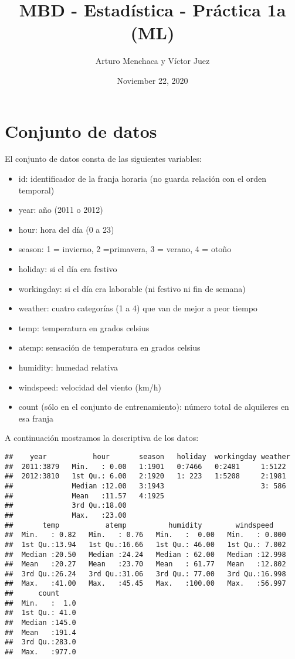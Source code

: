 \documentclass[
]{article}
\title{MBD - Estadística - Práctica 1a (ML)}
\author{Arturo Menchaca y Víctor Juez}
\date{Noviember 22, 2020}
\providecommand{\tightlist}{%
  \setlength{\itemsep}{0pt}\setlength{\parskip}{0pt}}
\begin{document}
\maketitle

\hypertarget{conjunto-de-datos}{%
\section{Conjunto de datos}\label{conjunto-de-datos}}

El conjunto de datos consta de las siguientes variables:

\begin{itemize}
\tightlist
\item
  id: identificador de la franja horaria (no guarda relación con el
  orden temporal)
\item
  year: año (2011 o 2012)
\item
  hour: hora del día (0 a 23)
\item
  season: 1 = invierno, 2 =primavera, 3 = verano, 4 = otoño
\item
  holiday: si el día era festivo
\item
  workingday: si el día era laborable (ni festivo ni fin de semana)
\item
  weather: cuatro categorías (1 a 4) que van de mejor a peor tiempo
\item
  temp: temperatura en grados celsius
\item
  atemp: sensación de temperatura en grados celsius
\item
  humidity: humedad relativa
\item
  windspeed: velocidad del viento (km/h)
\item
  count (sólo en el conjunto de entrenamiento): número total de
  alquileres en esa franja
\end{itemize}

A continuación mostramos la descriptiva de los datos:

\begin{verbatim}
##    year           hour       season   holiday  workingday weather 
##  2011:3879   Min.   : 0.00   1:1901   0:7466   0:2481     1:5122  
##  2012:3810   1st Qu.: 6.00   2:1920   1: 223   1:5208     2:1981  
##              Median :12.00   3:1943                       3: 586  
##              Mean   :11.57   4:1925                               
##              3rd Qu.:18.00                                        
##              Max.   :23.00                                        
##       temp           atemp          humidity        windspeed     
##  Min.   : 0.82   Min.   : 0.76   Min.   :  0.00   Min.   : 0.000  
##  1st Qu.:13.94   1st Qu.:16.66   1st Qu.: 46.00   1st Qu.: 7.002  
##  Median :20.50   Median :24.24   Median : 62.00   Median :12.998  
##  Mean   :20.27   Mean   :23.70   Mean   : 61.77   Mean   :12.802  
##  3rd Qu.:26.24   3rd Qu.:31.06   3rd Qu.: 77.00   3rd Qu.:16.998  
##  Max.   :41.00   Max.   :45.45   Max.   :100.00   Max.   :56.997  
##      count      
##  Min.   :  1.0  
##  1st Qu.: 41.0  
##  Median :145.0  
##  Mean   :191.4  
##  3rd Qu.:283.0  
##  Max.   :977.0
\end{verbatim}
\end{document}
